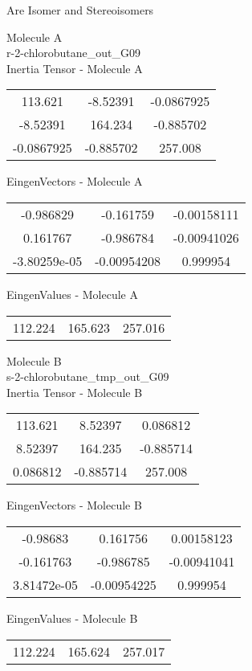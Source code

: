\begin{center}
\vtab
\vtab
\textcolor{NavyBlue}{\Large Are Isomer and Stereoisomers}
\end{center}
\newpage
\begin{multicols}{2}
\begin{center}
Molecule A \\ 
r-2-chlorobutane\_out\_G09
\\
Inertia Tensor - Molecule A \\
\vtab
\begin{tabular}{|c c c|}
113.621	 & 	-8.52391	 & 	-0.0867925	 \\
-8.52391	 & 	164.234	 & 	-0.885702	 \\
-0.0867925	 & 	-0.885702	 & 	257.008
\end{tabular}

\vtab
 EingenVectors - Molecule A     \\
\vtab
\begin{tabular}{|c c c|}
-0.986829	 & 	-0.161759	 & 	-0.00158111	 \\
0.161767	 & 	-0.986784	 & 	-0.00941026	 \\
-3.80259e-05	 & 	-0.00954208	 & 	0.999954
\end{tabular}

\vtab
 EingenValues - Molecule A     \\
\vtab
\begin{tabular}{|c c c|}
112.224	 & 	165.623	 & 	257.016
\end{tabular}
\columnbreak

Molecule B \\ 
s-2-chlorobutane\_tmp\_out\_G09
\\
Inertia Tensor - Molecule B \\
\vtab
\begin{tabular}{|c c c|}
113.621	 & 	8.52397	 & 	0.086812	 \\
8.52397	 & 	164.235	 & 	-0.885714	 \\
0.086812	 & 	-0.885714	 & 	257.008
\end{tabular}

\vtab
 EingenVectors - Molecule B     \\
\vtab
\begin{tabular}{|c c c|}
-0.98683	 & 	0.161756	 & 	0.00158123	 \\
-0.161763	 & 	-0.986785	 & 	-0.00941041	 \\
3.81472e-05	 & 	-0.00954225	 & 	0.999954
\end{tabular}

\vtab
 EingenValues - Molecule B     \\
\vtab
\begin{tabular}{|c c c|}
112.224	 & 	165.624	 & 	257.017
\end{tabular}

\end{center}
\end{multicols}
